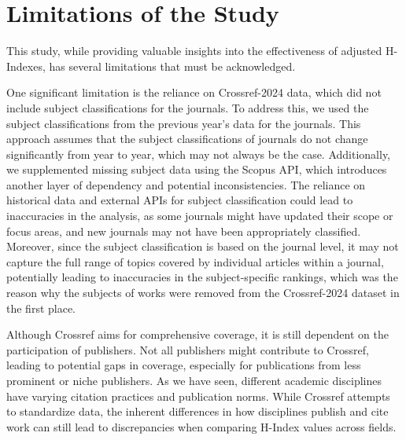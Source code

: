 
\section{Limitations of the Study}

This study, while providing valuable insights into the effectiveness of
adjusted H-Indexes, has several limitations that must be acknowledged.

One significant limitation is the reliance on Crossref-2024 data, which did not
include subject classifications for the journals. To address this, we used the
subject classifications from the previous year’s data for the journals. This
approach assumes that the subject classifications of journals do not change
significantly from year to year, which may not always be the case.
Additionally, we supplemented missing subject data using the Scopus API, which
introduces another layer of dependency and potential inconsistencies. The
reliance on historical data and external APIs for subject classification could
lead to inaccuracies in the analysis, as some journals might have updated their
scope or focus areas, and new journals may not have been appropriately
classified. Moreover, since the subject classification is based on the journal
level, it may not capture the full range of topics covered by individual
articles within a journal, potentially leading to inaccuracies in the
subject-specific rankings, which was the reason why the subjects of works were
removed from the Crossref-2024 dataset in the first place.

Although Crossref aims for comprehensive coverage, it is still dependent on the
participation of publishers. Not all publishers might contribute to Crossref,
leading to potential gaps in coverage, especially for publications from less
prominent or niche publishers. As we have seen, different academic disciplines
have varying citation practices and publication norms. While Crossref attempts
to standardize data, the inherent differences in how disciplines publish and
cite work can still lead to discrepancies when comparing H-Index values across
fields.

